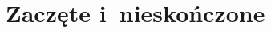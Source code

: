 \documentclass[a4paper,11pt]{article}
\begin{document}
\begin{enumerate}





















































\end{enumerate}










\newpage
\section{Zaczęte i~nieskończone}

\vspace{\spaceTwo}
\end{document}
